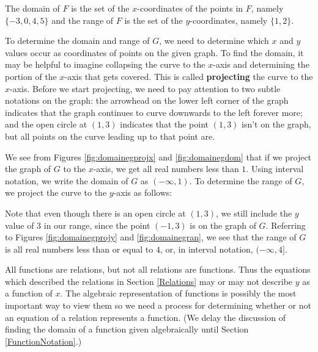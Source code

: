 {
The domain of $F$ is the set of the $x$-coordinates of the points in $F$, namely  $\{ -3, 0, 4, 5 \}$ and the range of $F$ is the set of the $y$-coordinates, namely $\{ 1,2 \}.$

\smallskip

\noindent To determine the domain and range of $G$, we need to determine which $x$ and $y$ values occur as coordinates of points on the given graph.  To find the domain, it may be helpful to imagine collapsing the curve to the $x$-axis and determining the portion of the $x$-axis that gets covered.  This is called  \textbf{projecting} the curve to the $x$-axis.  Before we start projecting, we need to pay attention to two subtle notations on the graph:  the arrowhead on the lower left corner of the graph indicates that the graph continues to curve downwards to the left forever more; and the open circle at $(1,3)$ indicates that the point $(1,3)$ isn't on the graph, but all points on the curve leading up to that point are.



We see from Figures \ref{fig:domainegprojx} and \ref{fig:domainegdom} that if we project the graph of $G$ to the $x$-axis, we get all real numbers less than $1$.  Using interval notation, we write the domain of $G$ as $(-\infty, 1)$.  To determine the range of $G$, we project the curve to the $y$-axis as follows: 


Note that even though there is an open circle at $(1,3)$, we still include the $y$ value of $3$ in our range, since the point $(-1,3)$ is on the graph of $G$.  Referring to Figures \ref{fig:domainegprojy} and \ref{fig:domainegran}, we see that the range of $G$ is all real numbers less than or equal to $4$, or, in interval notation,  $(-\infty, 4]$. 
}

\medskip

All functions are relations, but not all relations are functions.  Thus the equations which described the relations in Section \ref{Relations} may or may not describe $y$ as a function of $x$.  The algebraic representation of functions is possibly the most important way to view them so we need a process for determining whether or not an equation of a relation represents a function.  (We delay the discussion of finding the domain of a function given algebraically until Section \ref{FunctionNotation}.)



